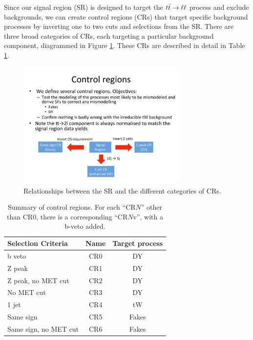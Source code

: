 Since our signal region (SR) is designed to target the $t\bar{t} \rightarrow \ell\ell$
process and exclude backgrounds, we can create control regions (CRs)
that target specific background processes by inverting one to two cuts
and selections from the SR. There are three broad categories of CRs,
each targeting a particular background component,
diagrammed in Figure \ref{fig:afb:crs}. These CRs are described in
detail in Table \ref{tab:afb:crdefs}.

\vspace{0.25in}
\begin{figure}[htb]
  \centering
  \includegraphics[width=0.75\textwidth]{figures/CRsdef.pdf}
  \caption{Relationships between the SR and the different categories of CRs.}
  \label{fig:afb:crs}
\end{figure}


\begin{table}[h]
\begin{center}
\caption{Summary of control regions. For each ``CR$N$'' other than
  CR0, there is a corresponding ``CR$N$v'', with a b-veto added.}
\label{tab:afb:crdefs}
{\small
\begin{tabular}{l|c c}
\hline
Selection Criteria & Name & Target process  \\
\hline
b veto & CR0 & DY \\
\hline
Z peak & CR1 & DY \\
\hline
Z peak, no MET cut & CR2 & DY \\
\hline
No MET cut & CR3 & DY \\
\hline
1 jet & CR4 & tW  \\
\hline
Same sign & CR5 & Fakes \\
\hline
Same sign, no MET cut & CR6 & Fakes \\
\hline
\end{tabular}
}
\end{center}
\end{table}

